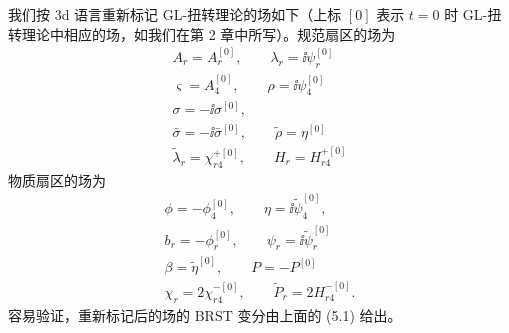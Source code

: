 我们按 3d 语言重新标记 GL-扭转理论的场如下（上标 $[0]$ 表示 $t=0$ 时 GL-扭转理论中相应的场，如我们在第 2 章中所写）。规范扇区的场为
\begin{gather*}
    A_r = A_r^{[0]}, \qquad \lambda_r = \ii\psi_r^{[0]} \\
    \varsigma = A_4^{[0]}, \qquad \rho = \ii\psi_4^{[0]} \\
    \sigma = -\ii\sigma^{[0]}, \\
    \bar\sigma = -\ii\bar\sigma^{[0]}, \qquad \tilde\rho = \eta^{[0]} \\
    \tilde\lambda_r = \chi_{r4}^{+[0]}, \qquad H_r = H_{r4}^{+[0]}
\end{gather*}
物质扇区的场为
\begin{gather*}
    \phi = -\phi_4^{[0]}, \qquad \eta = \ii\tilde\psi_4^{[0]}, \\
    b_r = -\phi_r^{[0]}, \qquad \psi_r = \ii\tilde\psi_r^{[0]} \\
    \beta = \tilde\eta^{[0]}, \qquad P = -P^{[0]} \\
    \chi_r = 2\chi_{r4}^{-[0]}, \qquad \tilde P_r = 2H_{r4}^{-[0]} .
\end{gather*}
容易验证，重新标记后的场的 BRST 变分由上面的 (5.1) 给出。
